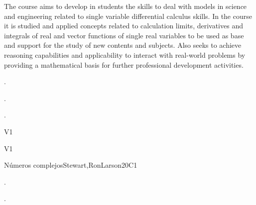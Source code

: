 \begin{syllabus}


\begin{justification}
The course aims to develop in students the skills to deal with models in science and engineering related to
single variable differential calculus skills. In the course it is studied and applied concepts related to calculation
limits, derivatives and integrals of real and vector functions of single real variables to be used as base and
support for the study of new contents and subjects. Also seeks to achieve reasoning capabilities and
applicability to interact with real-world problems by providing a mathematical basis for further professional
development activities.
\end{justification}

\begin{goals}
\item . %
\item . %
\item . %

\end{goals}

\begin{outcomes}{V1}
    \item {}
    \item {}
\end{outcomes}

\begin{competences}{V1}
    \item {}
    \item {}
    \item {}
\end{competences}

\begin{unit}{}{Números complejos}{Stewart,RonLarson}{20}{C1}
   \begin{topics}
    \item . %
    \item . %
   \end{topics}


\end{unit}
\end{syllabus}
